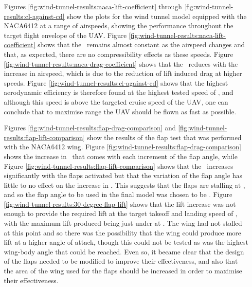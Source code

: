 \documentclass[../../main.tex]{subfiles}
\begin{document}
Figures \ref{fig:wind-tunnel-results:naca-lift-coefficient} through \ref{fig:wind-tunnel-results:cl-against-cd} show the plots for the wind tunnel model equipped with the NACA6412 at a range of airspeeds, showing the performance throughout the target flight envelope of the UAV.
Figure \ref{fig:wind-tunnel-results:naca-lift-coefficient} shows that the \cl\, remains almost constant as the airspeed changes and that, as expected, there are no compressibility effects as these speeds.
Figure \ref{fig:wind-tunnel-results:naca-drag-coefficient} shows that the \cd\, reduces with the increase in airspeed, which is due to the reduction of lift induced drag at higher speeds.
Figure \ref{fig:wind-tunnel-results:cl-against-cd} shows that the highest aerodynamic efficiency is therefore found at the highest tested speed of , and although this speed is above the targeted cruise speed of the UAV, one can conclude that to maximise range the UAV should be flown as fast as possible. 

Figures \ref{fig:wind-tunnel-results:flap-drag-comparison} and \ref{fig:wind-tunnel-results:flap-lift-comparison} show the results of the flap test that was performed with the NACA6412 wing.
Figure \ref{fig:wind-tunnel-results:flap-drag-comparison} shows the increase in \cd\, that comes with each increment of the flap angle, while Figure \ref{fig:wind-tunnel-results:flap-lift-comparison} shows that the \cl\, increases significantly with the flaps activated but that the variation of the flap angle has little to no effect on the increase in \cl.
This suggests that the flaps are stalling at , and so the flap angle to be used in the final model was chosen to be .
Figure \ref{fig:wind-tunnel-results:30-degree-flap-lift} shows that the lift increase was not enough to provide the required lift at the target takeoff and landing speed of , with the maximum lift produced being just under  at .
The wing had not stalled at this point and so there was the possibility that the wing could produce more lift at a higher angle of attack, though this could not be tested as  was the highest wing-body angle that could be reached.
Even so, it became clear that the design of the flaps needed to be modified to improve their effectiveness, and also that the area of the wing used for the flaps should be increased in order to maximise their effectiveness. 
\end{document}
